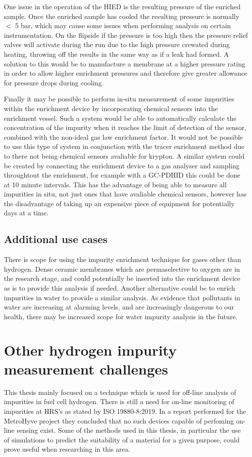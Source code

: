 One issue in the operation of the HIED is the resulting pressure of the enriched sample. Once the enriched sample has cooled the resulting pressure is normally $<$ 5 bar, which may cause some issues when performing analysis on certain instrumentation. On the flipside if the pressure is too high then the pressure relief valves will activate during the run due to the high pressure crewated during heating, throwing off the results in the same way as if a leak had formed. A solution to this would be to manufacture a membrane at a higher pressure rating in order to allow higher enrichment pressures and therefore give greater allowance for pressure drops during cooling. 

Finally it may be possible to perform in-situ measurement of some impurities within the enrichment device by incorporating chemical sensors into the enrichment vessel. Such a system would be able to automatically calculate the concentration of the impurity when it reaches the limit of detection of the sensor, combined with the non-ideal gas law enrichment factor. It would not be possible to use this type of system in conjunction with the tracer enrichment method due to there not being chemical sensors avaliable for krypton. A similar system could be created by connecting the enrichment device to a gas analyser and sampling throughtout the enrichment, for example with a GC-PDHID this could be done at 10 minute intervals. This has the advantage of being able to measure all impurities in situ, not just ones that have avaliable chemical sensors, however has the disadvantage of taking up an expensive piece of equipment for potentially days at a time. 

\subsection{Additional use cases}
There is scope for using the impurity enrichment technique for gases other than hydrogen. Dense ceramic membranes which are permaselective to oxygen are in the research stage, \cite{LIU2005103} and could potentially be inserted into the enrichment device as is to provide this analysis if needed. Another alternative could be to enrich impurities in water to provide a similar analysis. As evidence that pollutants in water are increasing at alarming levels, and are increasingly dangerous to our health, there may be increased scope for water impurity analysis in the future. \cite{marketresearchfirm}

\section{Other hydrogen impurity measurement challenges}
This thesis mainly focused on a technique which is used for off-line analysis of impurities in fuel cell hydrogen. There is still a need for on-line monitoring of impurities at HRS's as stated by ISO 19880-8:2019. In a report performed for the MetroHyve project they concluded that no such devices capable of perfoming on-line sensing exist. Some of the methods used in this thesis, in particular the use of simulations to predict the suitability of a material for a given purpose, could prove useful when researching in this area. 

